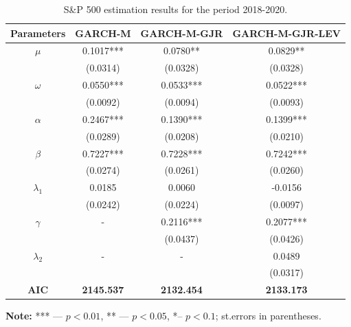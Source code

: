 \documentclass[authoryear, 1p]{elsarticle}
\numberwithin{equation}{section}
\begin{document}
\begin{table}[h!]
\begin{center}
\caption{S\&P 500 estimation results for the period 2018-2020.}
\label{tab:tab_6}
\begin{tabular*}{\textwidth}{cccc}
\hline
\hline
\textbf{Parameters} & \textbf{GARCH-M}  & \textbf{GARCH-M-GJR} & \textbf{GARCH-M-GJR-LEV} \\
\hline
\hline
$\mu$                  & 0.1017***         & 0.0780**             & 0.0829**                 \\
                    & (0.0314)          & (0.0328)             & (0.0328)                 \\
$\omega$               & 0.0550***         & 0.0533***            & 0.0522***                \\
                    & (0.0092)          & (0.0094)             & (0.0093)                 \\
$\alpha$               & 0.2467***         & 0.1390***            & 0.1399***                \\
                    & (0.0289)          & (0.0208)             & (0.0210)                 \\
$\beta$                & 0.7227***         & 0.7228***            & 0.7242***                \\
                    & (0.0274)          & (0.0261)             & (0.0260)                 \\
$\lambda_{1}$              & 0.0185            & 0.0060               & -0.0156                  \\
                    & (0.0242)          & (0.0224)             & (0.0097)                 \\
$\gamma$               & -                 & 0.2116***            & 0.2077***                \\
                    &                   & (0.0437)             & (0.0426)                 \\
$\lambda_{2}$           & -                 & -                    & 0.0489                   \\
                    &                   &                      & (0.0317)                 \\
\hline
\textbf{AIC}        & \textbf{2145.537} & \textbf{2132.454}    & \textbf{2133.173}        \\
\hline
\hline
\end{tabular*}
\end{center}
\footnotesize
\renewcommand{\baselineskip}{11pt}
\textbf{Note:} *** —  $p<0.01$, ** —  $p < 0.05$, *– $p < 0.1$; st.errors in parentheses.
\end{table}
\end{document}
